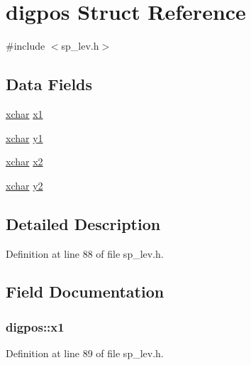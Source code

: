\hypertarget{structdigpos}{\section{digpos Struct Reference}
\label{structdigpos}
}


{\ttfamily \#include $<$sp\+\_\+lev.\+h$>$}

\subsection*{Data Fields}
\begin{DoxyCompactItemize}
\item 
\hyperlink{global_8h_a2043b7d01ce89f4ee2fa6c345a752d32}{xchar} \hyperlink{structdigpos_aad60428e493a6d6c3362fe12bd1dba3b}{x1}
\item 
\hyperlink{global_8h_a2043b7d01ce89f4ee2fa6c345a752d32}{xchar} \hyperlink{structdigpos_acbd032a285fefd8559374c9dc0d2e5da}{y1}
\item 
\hyperlink{global_8h_a2043b7d01ce89f4ee2fa6c345a752d32}{xchar} \hyperlink{structdigpos_a092425268fb484d27cdc0a3347e8219d}{x2}
\item 
\hyperlink{global_8h_a2043b7d01ce89f4ee2fa6c345a752d32}{xchar} \hyperlink{structdigpos_a190b007024704e0ff3f122944c74f4d4}{y2}
\end{DoxyCompactItemize}


\subsection{Detailed Description}


Definition at line 88 of file sp\+\_\+lev.\+h.



\subsection{Field Documentation}
\hypertarget{structdigpos_aad60428e493a6d6c3362fe12bd1dba3b}{
\subsubsection[{x1}]{ digpos\+::x1}}\label{structdigpos_aad60428e493a6d6c3362fe12bd1dba3b}


Definition at line 89 of file sp\+\_\+lev.\+h.



